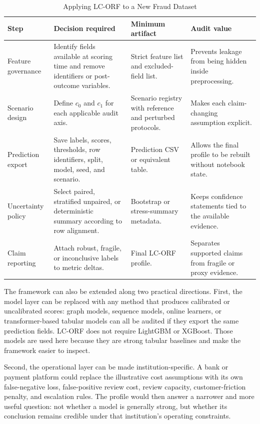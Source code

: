 \documentclass{ieeeaccess}
\begin{document}
\begin{table}[!htbp]
\caption{Applying LC-ORF to a New Fraud Dataset}
\label{tab:reuse}
\centering
\scriptsize
\setlength{\tabcolsep}{2pt}
\renewcommand{\arraystretch}{1.10}
\begin{tabularx}{\columnwidth}{|>{\raggedright\arraybackslash}p{}|>{\raggedright\arraybackslash}p{}|>{\raggedright\arraybackslash}p{}|>{\raggedright\arraybackslash}X|}
\hline
\textbf{Step} & \textbf{Decision required} & \textbf{Minimum artifact} & \textbf{Audit value}\\
\hline
Feature governance & Identify fields available at scoring time and remove identifiers or post-outcome variables. & Strict feature list and excluded-field list. & Prevents leakage from being hidden inside preprocessing.\\
\hline
Scenario design & Define $c_0$ and $c_1$ for each applicable audit axis. & Scenario registry with reference and perturbed protocols. & Makes each claim-changing assumption explicit.\\
\hline
Prediction export & Save labels, scores, thresholds, row identifiers, split, model, seed, and scenario. & Prediction CSV or equivalent table. & Allows the final profile to be rebuilt without notebook state.\\
\hline
Uncertainty policy & Select paired, stratified unpaired, or deterministic summary according to row alignment. & Bootstrap or stress-summary metadata. & Keeps confidence statements tied to the available evidence.\\
\hline
Claim reporting & Attach robust, fragile, or inconclusive labels to metric deltas. & Final LC-ORF profile. & Separates supported claims from fragile or proxy evidence.\\
\hline
\end{tabularx}
\end{table}

The framework can also be extended along two practical directions. First, the model layer can be replaced with any method that produces calibrated or uncalibrated scores: graph models, sequence models, online learners, or transformer-based tabular models can all be audited if they export the same prediction fields. LC-ORF does not require LightGBM or XGBoost. Those models are used here because they are strong tabular baselines and make the framework easier to inspect.

Second, the operational layer can be made institution-specific. A bank or payment platform could replace the illustrative cost assumptions with its own false-negative loss, false-positive review cost, review capacity, customer-friction penalty, and escalation rules. The profile would then answer a narrower and more useful question: not whether a model is generally strong, but whether its conclusion remains credible under that institution's operating constraints.
\end{document}
